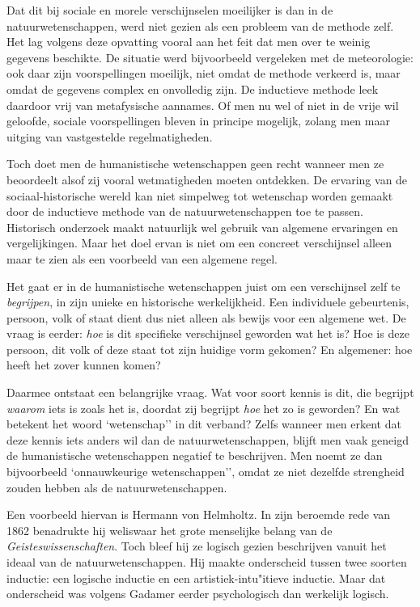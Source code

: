 Dat dit bij sociale en morele verschijnselen moeilijker is dan in de natuurwetenschappen, werd niet gezien als een probleem van de methode zelf. Het lag volgens deze opvatting vooral aan het feit dat men over te weinig gegevens beschikte. De situatie werd bijvoorbeeld vergeleken met de meteorologie: ook daar zijn voorspellingen moeilijk, niet omdat de methode verkeerd is, maar omdat de gegevens complex en onvolledig zijn. De inductieve methode leek daardoor vrij van metafysische aannames. Of men nu wel of niet in de vrije wil geloofde, sociale voorspellingen bleven in principe mogelijk, zolang men maar uitging van vastgestelde regelmatigheden.

Toch doet men de humanistische wetenschappen geen recht wanneer men ze beoordeelt alsof zij vooral wetmatigheden moeten ontdekken. De ervaring van de sociaal-historische wereld kan niet simpelweg tot wetenschap worden gemaakt door de inductieve methode van de natuurwetenschappen toe te passen. Historisch onderzoek maakt natuurlijk wel gebruik van algemene ervaringen en vergelijkingen. Maar het doel ervan is niet om een concreet verschijnsel alleen maar te zien als een voorbeeld van een algemene regel.

Het gaat er in de humanistische wetenschappen juist om een verschijnsel zelf te \textit{begrijpen}, in zijn unieke en historische werkelijkheid. Een individuele gebeurtenis, persoon, volk of staat dient dus niet alleen als bewijs voor een algemene wet. De vraag is eerder: \textit{hoe} is dit specifieke verschijnsel geworden wat het is? Hoe is deze persoon, dit volk of deze staat tot zijn huidige vorm gekomen? En algemener: hoe heeft het zover kunnen komen?

Daarmee ontstaat een belangrijke vraag. Wat voor soort kennis is dit, die begrijpt \textit{waarom} iets is zoals het is, doordat zij begrijpt \textit{hoe} het zo is geworden? En wat betekent het woord `wetenschap'' in dit verband? Zelfs wanneer men erkent dat deze kennis iets anders wil dan de natuurwetenschappen, blijft men vaak geneigd de humanistische wetenschappen negatief te beschrijven. Men noemt ze dan bijvoorbeeld `onnauwkeurige wetenschappen'', omdat ze niet dezelfde strengheid zouden hebben als de natuurwetenschappen.

Een voorbeeld hiervan is Hermann von Helmholtz. In zijn beroemde rede van 1862 benadrukte hij weliswaar het grote menselijke belang van de \textit{Geisteswissenschaften}. Toch bleef hij ze logisch gezien beschrijven vanuit het ideaal van de natuurwetenschappen. Hij maakte onderscheid tussen twee soorten inductie: een logische inductie en een artistiek-intu"itieve inductie. Maar dat onderscheid was volgens Gadamer eerder psychologisch dan werkelijk logisch.

